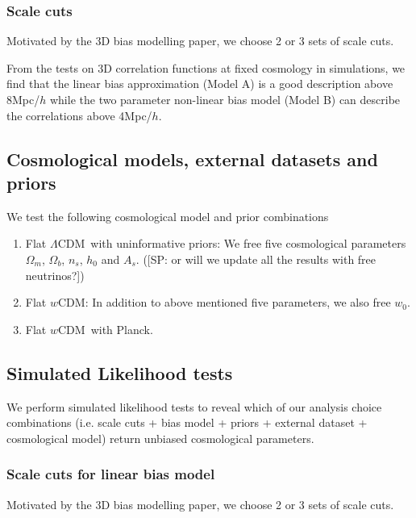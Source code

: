 \documentclass[fleqn,usenatbib]{mnras}
\newcommand{\lcdm}{$\Lambda$CDM}
\newcommand{\wcdm}{$w$CDM}
\newcommand{\SP}[1]{{\color{red}[SP: #1]}}
\begin{document}
\subsubsection{Scale cuts}
Motivated by the 3D bias modelling paper, we choose 2 or 3 sets of scale cuts.

From the tests on 3D correlation functions at fixed cosmology in simulations, we find that the linear bias approximation (Model A) is a good description above 8Mpc/$h$ while the two parameter non-linear bias model (Model B) can describe the correlations above 4Mpc/$h$.

\subsection{Cosmological models, external datasets and priors}
We test the following cosmological model and prior combinations
\begin{enumerate}
    \item Flat \lcdm\ with uninformative priors: We free five cosmological parameters $\Omega_m$, $\Omega_b$, $n_s$, $h_0$ and $A_s$. (\SP{or will we update all the results with free neutrinos?})
    \item Flat \wcdm : In addition to above mentioned five parameters, we also free $w_0$.
    \item Flat \wcdm\ with Planck.
\end{enumerate}



\subsection{Simulated Likelihood tests}\label{sec:simlike_analysis}


We perform simulated likelihood tests to reveal which of our analysis choice combinations (i.e. scale cuts + bias model + priors + external dataset + cosmological model) return unbiased cosmological parameters.

\subsubsection{Scale cuts for linear bias model}
Motivated by the 3D bias modelling paper, we choose 2 or 3 sets of scale cuts.

\end{document}
